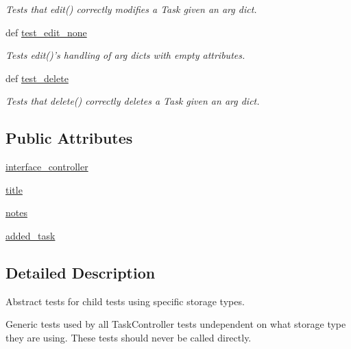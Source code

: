 \begin{DoxyCompactItemize}
\begin{DoxyCompactList}\small\item\em \-Tests that edit() correctly modifies a \-Task given an arg dict. \end{DoxyCompactList}\item 
def \hyperlink{classtest__taskcontroller_1_1TestTaskController_ac5d4cb8d40e6976c97f7bd9f0d0e5dc4}{test\-\_\-edit\-\_\-none}
\begin{DoxyCompactList}\small\item\em \-Tests edit()'s handling of arg dicts with empty attributes. \end{DoxyCompactList}\item 
def \hyperlink{classtest__taskcontroller_1_1TestTaskController_a2bf53edfdfd95abe028ce4ada0644263}{test\-\_\-delete}
\begin{DoxyCompactList}\small\item\em \-Tests that delete() correctly deletes a \-Task given an arg dict. \end{DoxyCompactList}\end{DoxyCompactItemize}
\subsection*{\-Public \-Attributes}
\begin{DoxyCompactItemize}
\item 
\hyperlink{classtest__taskcontroller_1_1TestTaskController_a16cbd17e4ad8bf93e164813b77313942}{interface\-\_\-controller}
\item 
\hyperlink{classtest__taskcontroller_1_1TestTaskController_a450431cde03f14169cd5ac04db704ab6}{title}
\item 
\hyperlink{classtest__taskcontroller_1_1TestTaskController_a9825f47dfebf3e25f03548d51d1d07d1}{notes}
\item 
\hyperlink{classtest__taskcontroller_1_1TestTaskController_a8b748405763b73406ca9cfafe467c0a1}{added\-\_\-task}
\end{DoxyCompactItemize}


\subsection{\-Detailed \-Description}
\-Abstract tests for child tests using specific storage types. 

\-Generic tests used by all \-Task\-Controller tests undependent on what storage type they are using. \-These tests should never be called directly. 

